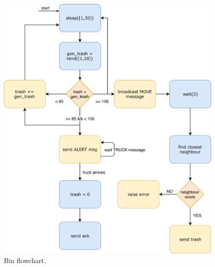 \documentclass[a4paper, 11pt, parskip=half]{scrartcl}
\begin{document}
\begin{figure}[H]
    \begin{minipage}[t]{0.55\textwidth}
        \centering
        \includegraphics[width=1\textwidth]{resources/bin_flow_chart}
        \caption{Bin flowchart.}
        \label{fig:bin-flow}
    \end{minipage}
    \hspace*{\fill}
    \begin{minipage}[t]{0.37\textwidth}
        \centering

\end{minipage}
\end{figure}
\end{document}
